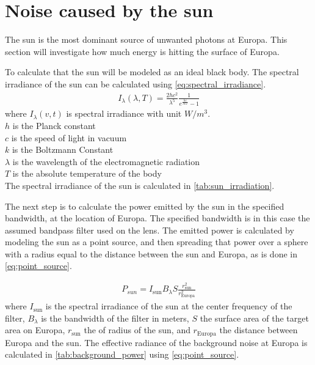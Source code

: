 \section{Noise caused by the sun}\label{ssec:background_noise}
The sun is the most dominant source of unwanted photons at Europa. This section will investigate how much energy is hitting the surface of Europa. 

To calculate that the sun will be modeled as an ideal black body. The spectral irradiance of the sun can be calculated using \cref{eq:spectral_irradiance}.
\begin{align}\label{eq:spectral_irradiance}
I_\lambda(\lambda,T) = \frac{2hc^2}{\lambda^5}\frac{1}{e^{\frac{hc}{\lambda kT}}-1}
\end{align}
where $I_\lambda(v,t)$ is spectral irradiance with unit $W/m^3$. \\
$h$ is the Planck constant\\
$c$ is the speed of light in vacuum \\
$k$ is the Boltzmann Constant \\
$\lambda$ is the wavelength of the electromagnetic radiation\\
$T$ is the absolute temperature of the body\\



The spectral irradiance of the sun is calculated in \cref{tab:sun_irradiation}.



The next step is to calculate the power emitted by the sun in the specified bandwidth, at the location of Europa. The specified bandwidth is in this case the assumed bandpass filter used on the lens. The emitted power is calculated by modeling the sun as a point source, and then spreading that power over a sphere with a radius equal to the distance between the sun and Europa, as is done in \cref{eq:point_source}.

\begin{align}\label{eq:point_source}
    P_{sun} = I_{\text{sun}} B_\lambda S \frac{r_{\text{sun}}^2}{r_{\text{Europa}}^2}
\end{align}
where $I_{\text{sun}}$ is the spectral irradiance of the sun at the center frequency of the filter, $B_\lambda$ is the bandwidth of the filter in meters, $S$ the surface area of the target area on Europa, $r_{\text{sun}}$ the of radius of the sun, and $r_{\text{Europa}}$ the distance between Europa and the sun. The effective radiance of the background noise at Europa is calculated in \cref{tab:background_power} using \cref{eq:point_source}.

